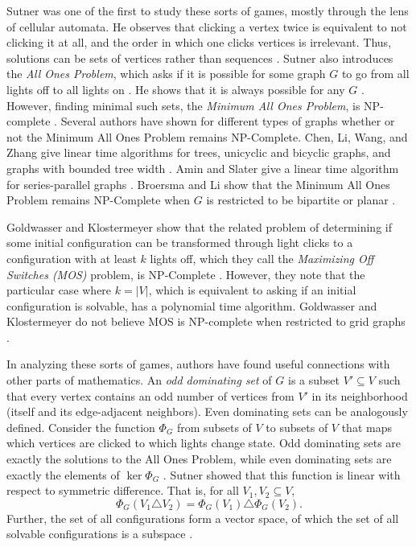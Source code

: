 \documentclass[a4paper]{article}
\newcommand{\abs}[1]{\left| #1 \right|}
\begin{document}
	
	Sutner was one of the first to study these sorts of games, mostly through the lens of cellular automata.
	He observes that clicking a vertex twice is equivalent to not clicking it at all, and the order in which one clicks vertices is irrelevant.
	Thus, solutions can be sets of vertices rather than sequences \cite{Sutner1989}.
	Sutner also introduces the \textit{All Ones Problem}, which asks if it is possible for some graph $G$ to go from all lights off to all lights on \cite{Sutner1988}.
	He shows that it is always possible for any $G$ \cite{Sutner1989}.
	However, finding minimal such sets, the \textit{Minimum All Ones Problem}, is NP-complete \cite{Sutner1988}.
	Several authors have shown for different types of graphs whether or not the Minimum All Ones Problem remains NP-Complete.
	Chen, Li, Wang, and Zhang give linear time algorithms for trees, unicyclic and bicyclic graphs, and graphs with bounded tree width \cite{CHEN200493}.
	Amin and Slater give a linear time algorithm for series-parallel graphs \cite{AminSlater1992}.
	Broersma and Li show that the Minimum All Ones Problem remains NP-Complete when $G$ is restricted to be bipartite or planar \cite{BROERSMA200760}.
	
	Goldwasser and Klostermeyer show that the related problem of determining if some initial configuration can be transformed through light clicks to a configuration with at least $k$ lights off, which they call the \textit{Maximizing Off Switches (MOS)} problem, is NP-Complete \cite{Goldwasser2000}.
	However, they note that the particular case where $k = \abs{V}$, which is equivalent to asking if an initial configuration is solvable, has a polynomial time algorithm.
	Goldwasser and Klostermeyer do not believe MOS is NP-complete when restricted to grid graphs \cite{Goldwasser2000}.
	
	In analyzing these sorts of games, authors have found useful connections with other parts of mathematics.
	An \textit{odd dominating set} of $G$ is a subset $V' \subseteq V$ such that every vertex contains an odd number of vertices from $V'$ in its neighborhood (itself and its edge-adjacent neighbors).
	Even dominating sets can be analogously defined.
	Consider the function $\Phi_G$ from subsets of $V$ to subsets of $V$ that maps which vertices are clicked to which lights change state.
	Odd dominating sets are exactly the solutions to the All Ones Problem, while even dominating sets are exactly the elements of $\ker{\Phi_G}$ \cite{Sutner1989}.
	Sutner showed that this function is linear with respect to symmetric difference.
	That is, for all $V_1, V_2 \subseteq V$,
	\begin{equation*}
		\Phi_G(V_1 \triangle V_2) = \Phi_G(V_1) \triangle \Phi_G(V_2).
	\end{equation*}
	Further, the set of all configurations form a vector space, of which the set of all solvable configurations is a subspace \cite{Sutner1988}. 
	
\end{document}
